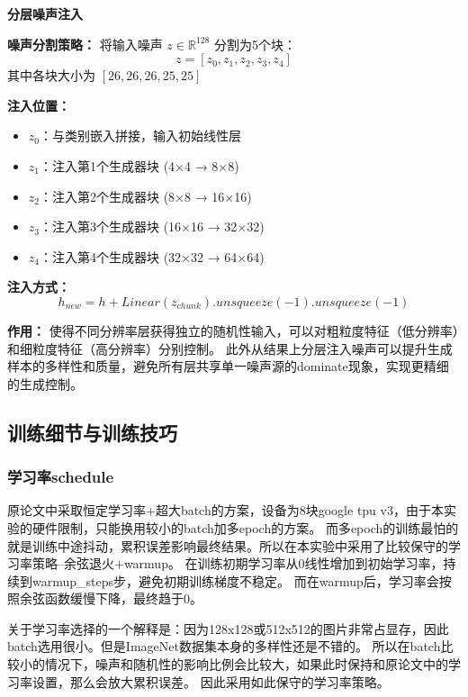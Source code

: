 \documentclass[12pt, a4paper]{article}
\begin{document}
\vspace{1cm}

\begin{center}
    \textbf{分层噪声注入}
\end{center}

\textbf{噪声分割策略：}
将输入噪声 $z \in \mathbb{R}^{128}$ 分割为5个块：
$$z = [z_0, z_1, z_2, z_3, z_4]$$
其中各块大小为 $[26, 26, 26, 25, 25]$

\textbf{注入位置：}
\begin{itemize}
    \item $z_0$：与类别嵌入拼接，输入初始线性层
    \item $z_1$：注入第1个生成器块 (4×4 → 8×8)
    \item $z_2$：注入第2个生成器块 (8×8 → 16×16)
    \item $z_3$：注入第3个生成器块 (16×16 → 32×32)
    \item $z_4$：注入第4个生成器块 (32×32 → 64×64)
\end{itemize}

\textbf{注入方式：}
$$h_{new} = h + Linear(z_{chunk}).unsqueeze(-1).unsqueeze(-1)$$

\textbf{作用：}
使得不同分辨率层获得独立的随机性输入，可以对粗粒度特征（低分辨率）和细粒度特征（高分辨率）分别控制。
此外从结果上分层注入噪声可以提升生成样本的多样性和质量，避免所有层共享单一噪声源的dominate现象，实现更精细的生成控制。

\newpage




\subsection{训练细节与训练技巧}

\subsubsection{学习率schedule}
原论文中采取恒定学习率+超大batch的方案，设备为8块google tpu v3，由于本实验的硬件限制，只能换用较小的batch加多epoch的方案。
而多epoch的训练最怕的就是训练中途抖动，累积误差影响最终结果。所以在本实验中采用了比较保守的学习率策略--余弦退火+warmup。
在训练初期学习率从0线性增加到初始学习率，持续到warmup\_steps步，避免初期训练梯度不稳定。
而在warmup后，学习率会按照余弦函数缓慢下降，最终趋于0。

关于学习率选择的一个解释是：因为128x128或512x512的图片非常占显存，因此batch选用很小。但是ImageNet数据集本身的多样性还是不错的。
所以在batch比较小的情况下，噪声和随机性的影响比例会比较大，如果此时保持和原论文中的学习率设置，那么会放大累积误差。
因此采用如此保守的学习率策略。
\end{document}
